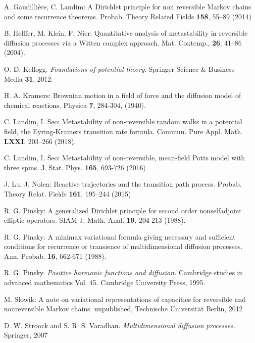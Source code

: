 \documentclass[reqno]{amsart}
\newcounter{as}[section]
\newcommand{\<}{\langle}
\renewcommand{\>}{\rangle}
\begin{document}
\begin{thebibliography}{99}
 A. Gaudilli\`ere, C. Landim: A Dirichlet principle for
  non reversible Markov chains and some recurrence theorems.
  Probab. Theory Related Fields {\bf 158}, 55--89 (2014)

 B. Helffer, M. Klein, F. Nier: Quantitative analysis of
  metastability in reversible diffusion processes via a Witten complex
  approach. Mat. Contemp., {\bf 26}, 41--86 (2004).

 O. D. Kellogg. {\sl Foundations of potential
    theory}. Springer Science \& Business Media {\bf 31}, 2012.

 H. A. Kramers: Brownian motion in a field of force and
  the diffusion model of chemical reactions. Physica {\bf 7}, 284-304,
  (1940).

 C. Landim, I. Seo: Metastability of non-reversible
  random walks in a potential field, the Eyring-Kramers transition
  rate formula. Commun. Pure Appl. Math. {\bf LXXI}, 203--266 (2018).

 C. Landim, I. Seo: Metastability of non-reversible,
  mean-field Potts model with three spins.  J. Stat. Phys.  {\bf 165},
  693-726 (2016)


 J. Lu, J. Nolen: Reactive trajectories and the transition
  path process. Probab. Theory Relat. Fields {\bf 161}, 195--244
  (2015)

 R. G. Pinsky: A generalized Dirichlet principle for
  second order nonselfadjoint elliptic operators. SIAM
  J. Math. Anal. {\bf 19}, 204-213 (1988).

 R. G. Pinsky: A minimax variational formula giving
  necessary and sufficient conditions for recurrence or transience of
  multidimensional diffusion processes. Ann. Probab. {\bf 16}, 662-671
  (1988).

 R. G. Pinsky. {\sl Positive harmonic functions and
    diffusion.} Cambridge studies in advanced mathematics
  Vol. 45. Cambridge University Press, 1995.

 M. Slowik: A note on variational representations of
  capacities for reversible and nonreversible Markov
  chains. unpublished, Technische Universit\"{a}t Berlin, 2012

  D. W. Stroock and S. R. S. Varadhan. {\sl
    Multidimensional diffusion processes}. Springer, 2007

\end{thebibliography}
\end{document}
